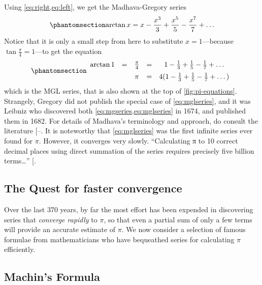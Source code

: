 \documentclass[
  a4paper,
]{article}
\begin{document}
Using \cref{eq:right,eq:left}, we get the Madhava-Gregory series
\begin{equation}\phantomsection\label{eq:mgseries}{
\arctan x = x - \frac{x^3}{3} + \frac{x^5}{5} - \frac{x^7}{7} + \dots
}\end{equation} Notice that it is only a small step from here to
substitute \(x = 1\)---because \(\tan\frac{\pi}{4} = 1\)---to get the
equation \begin{equation}\phantomsection\label{eq:mglseries}{
\begin{array}{ccccc}
\arctan 1 & = & \frac{\pi}{4} & = & 1 - \frac{1}{3} + \frac{1}{5} - \frac{1}{7} + \dots \\[0.5em]
&  & \pi & = & 4(1 - \frac{1}{3} + \frac{1}{5} - \frac{1}{7} + \dots)
\end{array}
}\end{equation} which is the MGL series, that is also shown at the top
of \cref{fig:pi-equations}. Strangely, Gregory did not publish the
special case of \cref{eq:mglseries}, and it was Leibniz who discovered
both \cref{eq:mgseries,eq:mglseries} in 1674, and published them in
1682. For details of Madhava's terminology and approach, do consult the
literature
{[}--\citeproc{ref-joseph2011}{19}{]}. It is
noteworthy that \cref{eq:mglseries} was the first infinite series ever
found for \(\pi\). However, it converges very slowly. ``Calculating π to
10 correct decimal places using direct summation of the series requires
precisely five billion terms\ldots{}''
{[}\citeproc{ref-leibniz-pi}{21}{]}.

\subsection{The Quest for faster
convergence}\label{the-quest-for-faster-convergence}

Over the last 370 years, by far the most effort has been expended in
discovering series that \emph{converge rapidly} to \(\pi\), so that even
a partial sum of only a few terms will provide an accurate estimate of
\(\pi\). We now consider a selection of famous formulae from
mathematicians who have bequeathed series for calculating \(\pi\)
efficiently.

\subsection{Machin's Formula}\label{machins-formula}
\end{document}
